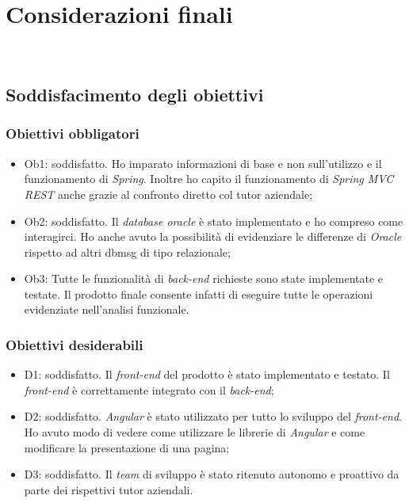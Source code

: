 
\chapter{Considerazioni finali}
\label{cap:considerazioni}

\\

\section{Soddisfacimento degli obiettivi}
\subsection{Obiettivi obbligatori}
\begin{itemize}
    \item Ob1: soddisfatto. Ho imparato informazioni di base e non sull'utilizzo e il funzionamento di \textit{Spring}. Inoltre ho capito il funzionamento di \textit{Spring MVC REST} anche grazie al confronto diretto col tutor aziendale;
    \item Ob2: soddisfatto. Il \textit{database oracle} è stato implementato e ho compreso come interagirci. Ho anche avuto la possibilità di evidenziare le differenze di \textit{Oracle} rispetto ad altri \gls{dbmsg} di tipo relazionale;
    \item Ob3: Tutte le funzionalità di \textit{back-end} richieste sono state implementate e testate. Il prodotto finale consente infatti di eseguire tutte le operazioni evidenziate nell'analisi funzionale.
\end{itemize}
\subsection{Obiettivi desiderabili}
\begin{itemize}
    \item D1: soddisfatto. Il \textit{front-end} del prodotto è stato implementato e testato. Il \textit{front-end} è correttamente integrato con il \textit{back-end};
    \item D2: soddisfatto. \textit{Angular} è stato utilizzato per tutto lo sviluppo del \textit{front-end}. Ho avuto modo di vedere come utilizzare le librerie di \textit{Angular} e come modificare la presentazione di una pagina;
    \item D3: soddisfatto. Il \textit{team} di sviluppo è stato ritenuto autonomo e proattivo da parte dei rispettivi tutor aziendali.
\end{itemize}
